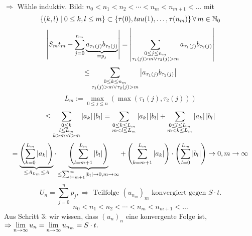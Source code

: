 \documentclass[../ana1.tex]{subfiles}
\begin{document}
\begin{bew}
    \( \Rightarrow \) Wähle induktiv. 
    Bild: 
    \( n_0 < n_1 < n_2 < \cdots < n_m < n_{m+1} < \ldots \) mit 
    \[ \{ (k,l) \; \vert \; 0 \leq k, l \leq m \} \subset \{ \tau(0), tau(1), \ldots , \tau(n_m) \} \, \forall \, m\in\mathbb{N}_0 \]
    \[ \left| S_m t_m - \sum_{j=0}^{n_m} \underbrace{ a_{\tau_1(j)} b_{\tau_2(j)} }_{=p_j} \right| = \left| \sum_{\substack{0\leq j\leq n_m \\ \tau_1(j) > m \vee \tau_2(j) > m}} a_{\tau_1(j)} b_{\tau_2(j)} \right| \]
    \[ \leq \sum_{\substack{0\leq k \leq n_m \\ \tau_1(j) > m \vee \tau_2(j) > m}} \left|a_{\tau_1(j)} b_{\tau_2(j)}\right| \]
    \[ L_m := \underset{0\leq j\leq n}{\max}(\max( \tau_1(j), \tau_2(j) ) ) \]
    \[ \leq \sum_{\substack{0\leq k \\ l\leq L_m \\ k > m \vee l > m}} \left|a_k\right| \left|b_l\right| = \sum_{\substack{0\leq k\leq L_m \\ m<l\leq L_m}} \left|a_k\right|\left|b_l\right| + \sum_{\substack{0\leq l \leq L_m \\ m<k\leq L_m}} \left|a_k\right|\left|b_l\right| \]
    \[ = \underbrace{\left( \sum_{k=0}^{L_m} \left|a_k\right| \right)}_{\leq A_{L_m} \leq A} \cdot \underbrace{\left( \sum_{l=m+1}^{L_m} \left|b_l\right| \right)}_{\leq \sum_{l=m+1}^\infty \left|b_l\right| \rightarrow 0, m\rightarrow \infty} + \left( \sum_{k=m+1}^{L_m} \left|a_k\right| \right) \cdot \left( \sum_{l=0}^{L_m} \left|b_l\right| \right) \rightarrow 0, m\rightarrow\infty \]
    \[ U_n = \sum_{j=0}^n p_j, \Rightarrow \text{ Teilfolge } {(u_{n_m})}_m \text{ konvergiert gegen } S \cdot t. \]
    \[ n_0 < n_1 < n_2 < \cdots < n_m < n_{m+1} < \dots \]
    Aus Schritt 3: wir wissen, dass \( (u_n)_n \) eine konvergente Folge ist, \( \Rightarrow \lim\limits_{n\rightarrow\infty} u_n = \lim\limits_{n\rightarrow\infty} u_{n_m} = S \cdot t. \)
\end{bew}
\end{document}
